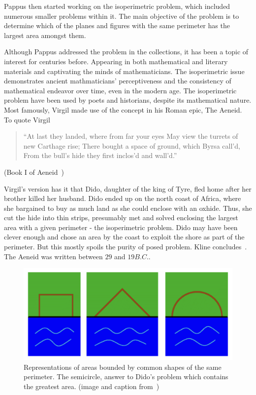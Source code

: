 \documentclass[a4paper]{book}
\begin{document}
Pappus then started working on the isoperimetric problem, which included numerous smaller problems within it. The main objective of the problem is to determine which of the planes and figures with the same perimeter has the largest area amongst them.

Although Pappus addressed the problem in the collections, it has been a topic of interest for centuries before. Appearing in both mathematical and literary materials and captivating the minds of mathematicians. 
\newline
\newline
The isoperimetric issue demonstrates ancient mathmaticians' perceptiveness and the consistency of mathematical endeavor over time, even in the modern age. The isoperimetric problem have been used by poets and historians, despite its mathematical nature. Most famously, Virgil made use of the concept in his Roman epic, The Aeneid. To quote Virgil
\begin{center}
    \begin{quote}
        ``At last they landed, where from far your eyes
        May view the turrets of new Carthage rise;
        There bought a space of ground, which Byrsa call'd,
        From the bull's hide they first inclos'd and wall'd.''
    \end{quote}
    (Book I of Aeneid~\cite{virgil1981aeneid})
\end{center}

Virgil's version has it that Dido, daughter of the king of Tyre, fled home after her brother killed her husband. Dido ended up on the north coast of Africa, where she bargained to buy as much land as she could enclose with an oxhide. Thus, she cut the hide into thin strips, presumably met and solved enclosing the largest area with a given perimeter - the isoperimetric problem. Dido may have been clever enough and chose an area by the coast to exploit the shore as part of the perimeter. But this mostly spoils the purity of posed problem. Kline concludes~\cite{kline1985mathematics}. The Aeneid was written between $29$ and $19 B.C.$.
\begin{figure}[h]
    \begin{center}   
        \includegraphics[width=120mm]{dido_1}
        \caption{Representations of areas bounded by common shapes of the same perimeter. The semicircle, answer to Dido's problem which contains the greatest area. (image and caption from~\cite{demjanenko2008isoperimetric})}
    \end{center}
\end{figure}
\leavevmode
\end{document}
